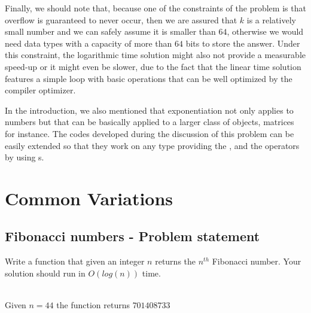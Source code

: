 

Finally, we should note that, because one of the constraints of the problem is that overflow is guaranteed to never occur, then we are assured that $k$ is a relatively small number and we can safely assume it is smaller than $64$, otherwise we would need data types with a capacity of more than $64$ bits to store the answer.
Under this constraint, the logarithmic time solution might also not provide a measurable speed-up or it might even be slower, due to the fact that the linear time solution features a simple loop with basic operations that can be well optimized by the compiler optimizer.


In the introduction, we also mentioned that exponentiation not only applies to numbers but that can be basically applied to a larger class of objects, matrices for instance. The codes developed during the discussion of this problem can be easily extended so that they work on any type providing the , and the
 operators by using s.


\section{Common Variations}

\subsection{Fibonacci numbers - Problem statement }

\begin{exercise}
Write a function that given an integer $n$ returns the $n^{th}$ Fibonacci number. 
Your solution should run in $O(log(n))$ time. 

    \begin{example}
        \hfill \\
        Given $n=44$ the function returns $701408733$
    \end{example}

\end{exercise}

